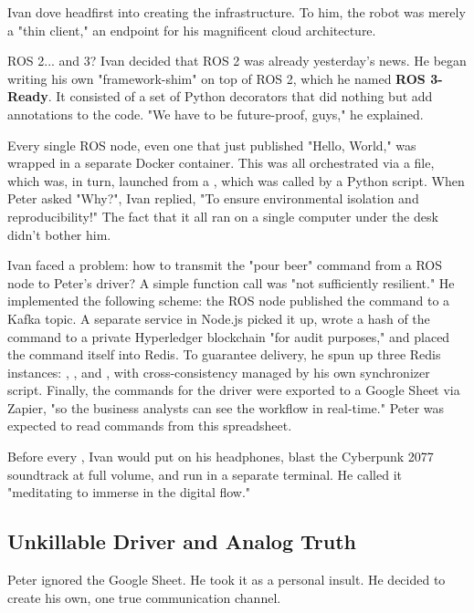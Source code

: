Ivan dove headfirst into creating the infrastructure. To him, the robot was merely a "thin client," an endpoint for his magnificent cloud architecture.

\begin{principlebox}{ROS 2... and 3?}
Ivan decided that ROS 2 was already yesterday's news. He began writing his own "framework-shim" on top of ROS 2, which he named \textbf{ROS 3-Ready}. It consisted of a set of Python decorators that did nothing but add  annotations to the code. "We have to be future-proof, guys," he explained.
\end{principlebox}

Every single ROS node, even one that just published "Hello, World," was wrapped in a separate Docker container. This was all orchestrated via a  file, which was, in turn, launched from a , which was called by a Python script. When Peter asked "Why?", Ivan replied, "To ensure environmental isolation and reproducibility!" The fact that it all ran on a single computer under the desk didn't bother him.

Ivan faced a problem: how to transmit the "pour beer" command from a ROS node to Peter's driver? A simple function call was "not sufficiently resilient." He implemented the following scheme: the ROS node published the command to a Kafka topic. A separate service in Node.js picked it up, wrote a hash of the command to a private Hyperledger blockchain "for audit purposes," and placed the command itself into Redis. To guarantee delivery, he spun up three Redis instances: , , and , with cross-consistency managed by his own synchronizer script. Finally, the commands for the driver were exported to a Google Sheet via Zapier, "so the business analysts can see the workflow in real-time." Peter was expected to read commands from this spreadsheet.

Before every , Ivan would put on his headphones, blast the Cyberpunk 2077 soundtrack at full volume, and run  in a separate terminal. He called it "meditating to immerse in the digital flow."

\subsection*{Unkillable Driver and Analog Truth}

Peter ignored the Google Sheet. He took it as a personal insult. He decided to create his own, one true communication channel.

